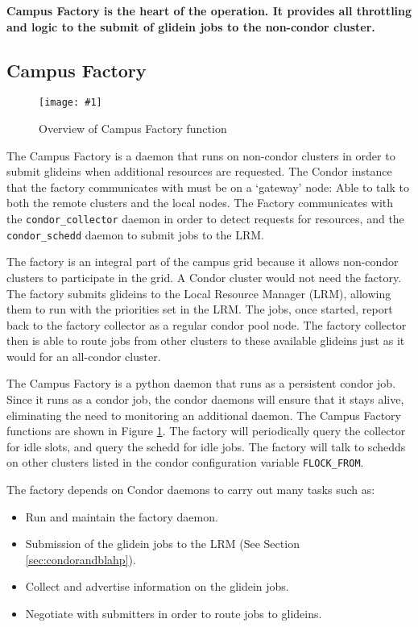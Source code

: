 \documentclass[11pt]{article}
\newlength{\imgwidth}
\newcommand\scalegraphics[1]{%
    \settowidth{\imgwidth}{\texttt{[image: \#1]}}%
    \setlength{\imgwidth}{\minof{\imgwidth}{\textwidth}}%
    \texttt{[image: \#1]}%
}
\begin{document}
\textbf{ Campus Factory is the heart of the operation.  It provides all throttling and logic to the submit of glidein jobs to the non-condor cluster.}

\subsection{Campus Factory}
\begin{figure}[ht]
\centering
\scalegraphics{images/FactoryOverview.pdf}
\caption{Overview of Campus Factory function}
\label{fig:campusfactoryoverview}
\end{figure}
The Campus Factory is a daemon that runs on non-condor clusters in order to submit glideins when additional resources are requested.  The Condor instance that the factory communicates with must be on a `gateway' node: Able to talk to both the remote clusters and the local nodes.   The Factory communicates with the \texttt{condor\_collector} daemon in order to detect requests for resources, and the \texttt{condor\_schedd} daemon to submit jobs to the LRM.  

The factory is an integral part of the campus grid because it allows non-condor clusters to participate in the grid.  A Condor cluster would not need the factory.  The factory submits glideins to the Local Resource Manager (LRM), allowing them to run with the priorities set in the LRM.  The jobs, once started, report back to the factory collector as a regular condor pool node.  The factory collector then is able to route jobs from other clusters to these available glideins just as it would for an all-condor cluster.

The Campus Factory is a python daemon that runs as a persistent condor job.  Since it runs as a condor job, the condor daemons will ensure that it stays alive, eliminating the need to monitoring an additional daemon.  The Campus Factory functions are shown in Figure \ref{fig:campusfactoryoverview}.  The factory will periodically query the collector for idle slots, and query the schedd for idle jobs.  The factory will talk to schedds on other clusters listed in the condor configuration variable \texttt{FLOCK\_FROM}.

The factory depends on Condor daemons to carry out many tasks such as:
\begin{itemize}
\item Run and maintain the factory daemon.
\item Submission of the glidein jobs to the LRM (See Section \ref{sec:condorandblahp}).
\item Collect and advertise information on the glidein jobs.
\item Negotiate with submitters in order to route jobs to glideins.
\end{itemize}
\end{document}
